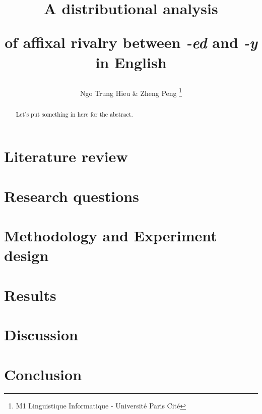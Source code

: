\documentclass[12pt]{article}
\title{A distributional analysis 

of affixal rivalry between \emph{-ed} and \emph{-y} in English}
\author{Ngo Trung Hieu & Zheng Peng \thanks{M1 Linguistique Informatique - Université Paris Cité}}
\date{}
\begin{document}
\maketitle

\begin{abstract}
    Let's put something in here for the abstract.
\end{abstract}

\section{Literature review}


\section{Research questions}

\section{Methodology and Experiment design}


\section{Results}

\section{Discussion}

\section{Conclusion}    



\end{document}
